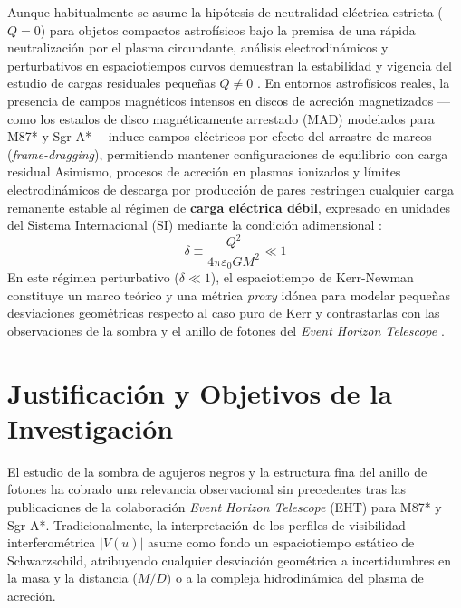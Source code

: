 Aunque habitualmente se asume la hipótesis de neutralidad eléctrica estricta ($Q = 0$) para objetos compactos astrofísicos bajo la premisa de una rápida neutralización por el plasma circundante, análisis electrodinámicos y perturbativos en espaciotiempos curvos demuestran la estabilidad y vigencia del estudio de cargas residuales pequeñas $Q \neq 0$ \citep{PhysRevLett.114.151101, s10052-021-09180-y}. En entornos astrofísicos reales, la presencia de campos magnéticos intensos en discos de acreción magnetizados —como los estados de disco magnéticamente arrestado (MAD) modelados para M87* y Sgr A*— induce campos eléctricos por efecto del arrastre de marcos (\textit{frame-dragging}), permitiendo mantener configuraciones de equilibrio con carga residual \citep{EHT_Paper1, 2406.09498v1} Asimismo, procesos de acreción en plasmas ionizados y límites electrodinámicos de descarga por producción de pares restringen cualquier carga remanente estable al régimen de \textbf{carga eléctrica débil}, expresado en unidades del Sistema Internacional (SI) mediante la condición adimensional \citep{1403.5234v2, Broderick_2022_ApJ_927_6}:
\begin{equation}
    \delta \equiv \frac{Q^2}{4\pi\varepsilon_0 G M^2} \ll 1
\end{equation}
En este régimen perturbativo ($\delta \ll 1$), el espaciotiempo de Kerr-Newman constituye un marco teórico y una métrica \textit{proxy} idónea para modelar pequeñas desviaciones geométricas respecto al caso puro de Kerr y contrastarlas con las observaciones de la sombra y el anillo de fotones del \textit{Event Horizon Telescope} \citep{1403.5234v2, Broderick_2022_ApJ_927_6}.


\section{Justificación y Objetivos de la Investigación}

El estudio de la sombra de agujeros negros y la estructura fina del anillo de fotones ha cobrado una relevancia observacional sin precedentes tras las publicaciones de la colaboración \textit{Event Horizon Telescope} (EHT) para M87* y Sgr A*. Tradicionalmente, la interpretación de los perfiles de visibilidad interferométrica $|V(u)|$ asume como fondo un espaciotiempo estático de Schwarzschild, atribuyendo cualquier desviación geométrica a incertidumbres en la masa y la distancia ($M/D$) o a la compleja hidrodinámica del plasma de acreción. 

